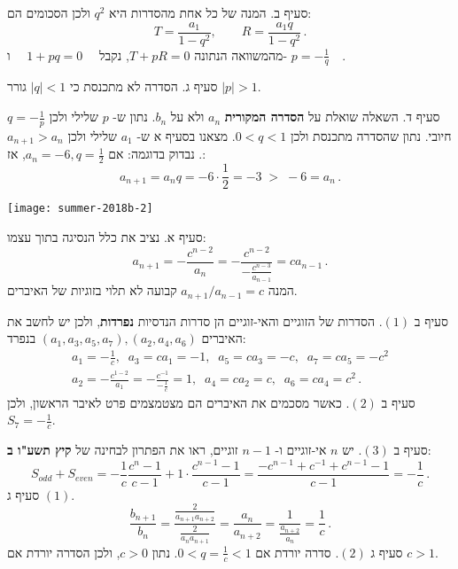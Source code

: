 סעיף ב. המנה של כל אחת מהסדרות היא
$q^2$
ולכן הסכומים הם:
\[
T = \frac{a_1}{1-q^2},\quad\quad R = \frac{a_1q}{1-q^2}\,.
\]
מהמשוואה הנתונה
$T+pR=0$,
נקבל
$\quad 1+pq=0\quad$
ו-%
$p=-\displaystyle\frac{1}{q}\quad$.

סעיף ג. הסדרה לא מתכנסת כי 
$|q|<1$
גורר
$|p|>1$.

סעיף ד. השאלה שואלת על
\textbf{הסדרה המקורית}
$a_n$
ולא על 
$b_n$.
נתון ש-%
$p$
שלילי ולכן
$q=-\displaystyle\frac{1}{p}$
חיובי. נתון שהסדרה מתכנסת ולכן
$0<q<1$.
מצאנו בסעיף א ש-%
$a_1$
שלילי ולכן
$a_{n+1}>a_n$.
נבדוק בדוגמה: אם 
$a_n=-6,q=\frac{1}{2}$,
אז:
\[
a_{n+1} = a_nq = -6\cdot \frac{1}{2} = -3 \;> \; -6 =a_n\,.
\]


\textbf{}

\begin{center}
\texttt{[image: summer-2018b-2]}
\end{center}
\vspace{-2ex}
סעיף א. נציב את כלל הנסיגה בתוך עצמו:
\[
a_{n+1} = -\frac{c^{n-2}}{a_n} = -\frac{c^{n-2}}{\displaystyle -\frac{c^{n-3}}{a_{n-1}}} = ca_{n-1}\,.
\]
המנה
$a_{n+1}/a_{n-1}=c$
קבועה לא תלוי בזוגיות של האיברים.

סעיף ב
$(1)$.
הסדרות של הזוגיים והאי-זוגיים הן סדרות הנדסיות
\textbf{נפרדות},
ולכן יש לחשב את האיברים
$(a_1,a_3,a_5,a_7), (a_2,a_4,a_6)$
בנפרד:
\[
\renewcommand{\arraystretch}{2}
\begin{array}{l}
a_1=-\displaystyle\frac{1}{c},\;\;a_3=ca_1=-1,\;\;a_5=ca_3=-c,\;\;a_7=ca_5=-c^2\\
a_2=\displaystyle
-\frac{c^{1-2}}{a_1}=
-\frac{c^{-1}}{-\frac{1}{c}}=1,\;\;a_4=ca_2=c,\;\;a_6=ca_4=c^2\,.
\end{array}
\]
סעיף ב
$(2)$.
כאשר מסכמים את האיברים הם מצטמצמים פרט לאיבר הראשון, ולכן
$S_7=-\frac{1}{c}$.

סעיף ב
$(3)$.
יש 
$n$ 
אי-זוגיים ו-%
$n-1$
זוגיים, ראו את הפתרון לבחינה של
\textbf{קיץ תשע"ו ב}:
\[
S_{\mathit{odd}}+S_{\mathit{even}}=-\frac{1}{c}\frac{c^n-1}{c-1}+ 1\cdot\frac{c^{n-1}-1}{c-1}= \frac{-c^{n-1}+c^{-1} + c^{n-1}-1}{c-1}= -\frac{1}{c}\,.
\]
סעיף ג
$(1)$.
\[
\frac{b_{n+1}}{b_n} = \frac{\displaystyle\frac{2}{a_{n+1}a_{n+2}}}{\displaystyle\frac{2}{a_{n}a_{n+1}}}= \frac{a_n}{a_{n+2}} =  \frac{1}{\displaystyle\frac{a_{n+2}}{a_n}} = \frac{1}{c}\,.
\]
סעיף ג
$(2)$.
סדרה יורדת אם
$0<q=\displaystyle\frac{1}{c} < 1$.
נתון
$c>0$,
ולכן הסדרה יורדת אם
$c>1$.

